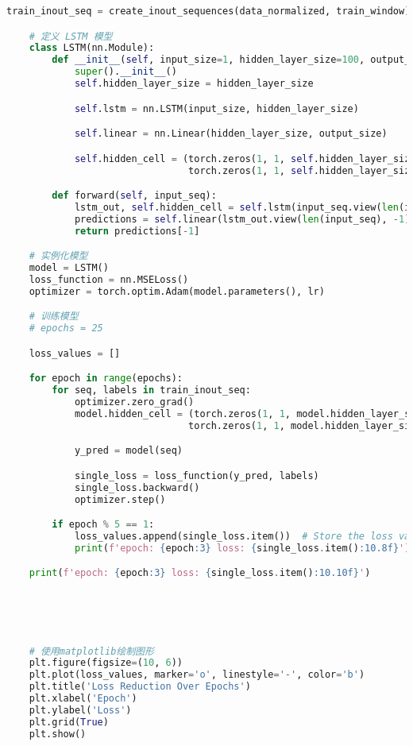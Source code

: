 \begin{lstlisting}[language=python,caption={数字农业渗透}]
    train_inout_seq = create_inout_sequences(data_normalized, train_window)

    # 定义 LSTM 模型
    class LSTM(nn.Module):
        def __init__(self, input_size=1, hidden_layer_size=100, output_size=1):
            super().__init__()
            self.hidden_layer_size = hidden_layer_size

            self.lstm = nn.LSTM(input_size, hidden_layer_size)

            self.linear = nn.Linear(hidden_layer_size, output_size)

            self.hidden_cell = (torch.zeros(1, 1, self.hidden_layer_size),
                                torch.zeros(1, 1, self.hidden_layer_size))

        def forward(self, input_seq):
            lstm_out, self.hidden_cell = self.lstm(input_seq.view(len(input_seq), 1, -1), self.hidden_cell)
            predictions = self.linear(lstm_out.view(len(input_seq), -1))
            return predictions[-1]

    # 实例化模型
    model = LSTM()
    loss_function = nn.MSELoss()
    optimizer = torch.optim.Adam(model.parameters(), lr)

    # 训练模型
    # epochs = 25

    loss_values = [] 

    for epoch in range(epochs):
        for seq, labels in train_inout_seq:
            optimizer.zero_grad()
            model.hidden_cell = (torch.zeros(1, 1, model.hidden_layer_size),
                                torch.zeros(1, 1, model.hidden_layer_size))

            y_pred = model(seq)

            single_loss = loss_function(y_pred, labels)
            single_loss.backward()
            optimizer.step()

        if epoch % 5 == 1:
            loss_values.append(single_loss.item())  # Store the loss value
            print(f'epoch: {epoch:3} loss: {single_loss.item():10.8f}')

    print(f'epoch: {epoch:3} loss: {single_loss.item():10.10f}')





    # 使用matplotlib绘制图形
    plt.figure(figsize=(10, 6))
    plt.plot(loss_values, marker='o', linestyle='-', color='b')
    plt.title('Loss Reduction Over Epochs')
    plt.xlabel('Epoch')
    plt.ylabel('Loss')
    plt.grid(True)
    plt.show()



\end{lstlisting}
